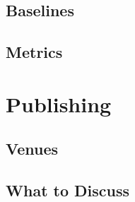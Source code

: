 \subsection{Baselines}

\subsection{Metrics}

\section{Publishing}

\subsection{Venues}

\subsection{What to Discuss}
